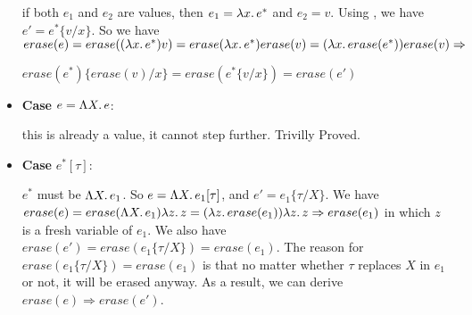 \documentclass[10pt]{article}
\begin{document}
\begin{exercise}
\begin{itemize}
	if both $e_1$ and $e_2$ are values, then $e_1 = \lambda x.\,e^*$ and $e_2 = v$. Using ,
	we have $e' = e^*\{v/x\}$. So we have $erase(e) = erase((\lambda x.\,e^*)v) = erase(\lambda x.\,e^*)erase(v) =
	(\lambda x.\,erase(e^*))erase(v) \Rightarrow$ 
	
	$erase(e^*)\{erase(v)/x\} = erase(e^*\{v/x\}) = erase(e') $
	\item \textbf{Case} $e = \Lambda X.\,e$:

	this is already a value, it cannot step further. Trivilly Proved.
	\item \textbf{Case} $e^*[\tau]$:

	$e^*$ must be $\Lambda X.\,e_1$. So $e = \Lambda X.\,e_1[\tau]$, and $e' = e_1\{\tau/X\}$.
	We have $erase(e) = erase(\Lambda X.\,e_1)\lambda z.\,z = (\lambda z.\,erase(e_1))\lambda z.\,z \Rightarrow erase(e_1)$ in
	which $z$ is a fresh variable of $e_1$. 
	We also have $erase(e') = erase(e_1\{\tau/X\}) = erase(e_1)$. 
	The reason for $erase(e_1\{\tau/X\}) = erase(e_1)$ is that
	no matter whether $\tau$ replaces $X$ in $e_1$ or not, it will be erased anyway. As a result, we can derive
	$erase(e) \Rightarrow erase(e')$.
\end{itemize}
\end{exercise}
\end{document}
